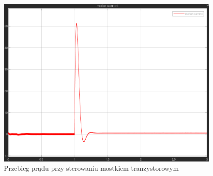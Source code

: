 \documentclass[11pt]{article}
\begin{document}
\begin{figure}[H]
    \centering
    \includegraphics[width=0.9\linewidth]{aun1_tranz_prad.png}
    \caption{Przebieg prądu przy sterowaniu mostkiem tranzystorowym}
    \label{fig:tranz_prad}
\end{figure}
\end{document}
